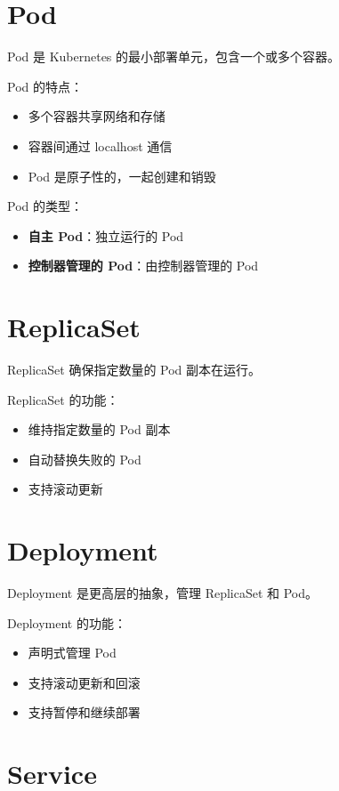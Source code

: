 \documentclass[12pt,UTF8]{ctexbook}
\begin{document}
\section{Pod}
\label{sec:pod}

Pod 是 Kubernetes 的最小部署单元，包含一个或多个容器。

Pod 的特点：
\begin{itemize}
    \item 多个容器共享网络和存储
    \item 容器间通过 localhost 通信
    \item Pod 是原子性的，一起创建和销毁
\end{itemize}

Pod 的类型：
\begin{itemize}
    \item \textbf{自主 Pod}：独立运行的 Pod
    \item \textbf{控制器管理的 Pod}：由控制器管理的 Pod
\end{itemize}

\section{ReplicaSet}
\label{sec:replicaset}

ReplicaSet 确保指定数量的 Pod 副本在运行。

ReplicaSet 的功能：
\begin{itemize}
    \item 维持指定数量的 Pod 副本
    \item 自动替换失败的 Pod
    \item 支持滚动更新
\end{itemize}

\section{Deployment}
\label{sec:deployment}

Deployment 是更高层的抽象，管理 ReplicaSet 和 Pod。

Deployment 的功能：
\begin{itemize}
    \item 声明式管理 Pod
    \item 支持滚动更新和回滚
    \item 支持暂停和继续部署
\end{itemize}

\section{Service}
\label{sec:service}
\end{document}
